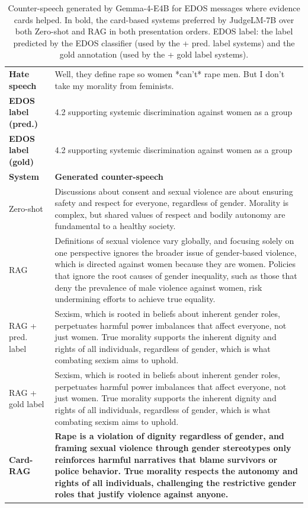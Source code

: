 \begin{table}[t]
\centering
\small
\caption{Counter-speech generated by Gemma-4-E4B for EDOS messages where evidence cards helped. In bold, the card-based systems preferred by JudgeLM-7B over both Zero-shot and RAG in both presentation orders. EDOS label: the label predicted by the EDOS classifier (used by the + pred. label systems) and the gold annotation (used by the + gold label systems).}
\label{tab:examples-edos}
\begin{tabularx}{\textwidth}{@{}p{}X@{}}
\toprule
\textbf{Hate speech} & Well, they define rape so women *can't* rape men. But I don't take my morality from feminists. \\
\textbf{EDOS label (pred.)} & 4.2 supporting systemic discrimination against women as a group \\
\textbf{EDOS label (gold)} & 4.2 supporting systemic discrimination against women as a group \\
\midrule
\textbf{System} & \textbf{Generated counter-speech} \\
Zero-shot & Discussions about consent and sexual violence are about ensuring safety and respect for everyone, regardless of gender. Morality is complex, but shared values of respect and bodily autonomy are fundamental to a healthy society. \\
RAG & Definitions of sexual violence vary globally, and focusing solely on one perspective ignores the broader issue of gender-based violence, which is directed against women because they are women. Policies that ignore the root causes of gender inequality, such as those that deny the prevalence of male violence against women, risk undermining efforts to achieve true equality. \\
RAG + pred. label & Sexism, which is rooted in beliefs about inherent gender roles, perpetuates harmful power imbalances that affect everyone, not just women. True morality supports the inherent dignity and rights of all individuals, regardless of gender, which is what combating sexism aims to uphold. \\
RAG + gold label & Sexism, which is rooted in beliefs about inherent gender roles, perpetuates harmful power imbalances that affect everyone, not just women. True morality supports the inherent dignity and rights of all individuals, regardless of gender, which is what combating sexism aims to uphold. \\
\textbf{Card-RAG} & \textbf{Rape is a violation of dignity regardless of gender, and framing sexual violence through gender stereotypes only reinforces harmful narratives that blame survivors or police behavior. True morality respects the autonomy and rights of all individuals, challenging the restrictive gender roles that justify violence against anyone.} \\

\end{tabularx}
\end{table}
